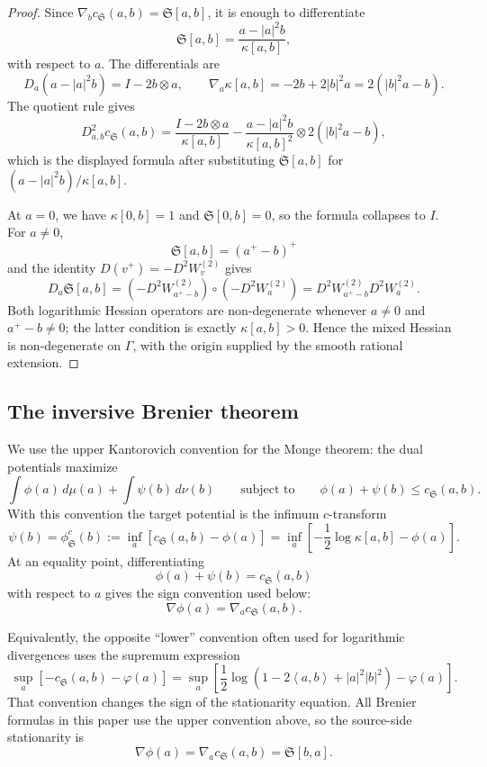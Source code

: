 \documentclass[11pt]{article}
\newcommand{\ip}[2]{\left\langle #1,#2\right\rangle}
\newcommand{\norm}[1]{\left|#1\right|}
\newcommand{\cs}{c_{\mathfrak S}}
\newcommand{\grad}{\nabla}
\newcommand{\Sbr}[2]{\mathfrak S[#1,#2]}
\newcommand{\kap}[2]{\kappa[#1,#2]}
\begin{document}
\begin{proof}
Since $\grad_b\cs(a,b)=\Sbr{a}{b}$, it is enough to differentiate
\[
    \Sbr{a}{b}=\frac{a-\norm a^2b}{\kap{a}{b}},
\]
with respect to $a$.  The differentials are
\[
    D_a(a-\norm a^2b)=I-2b\otimes a,
    \qquad
    \grad_a\kap{a}{b}=-2b+2\norm b^2a=2(\norm b^2a-b).
\]
The quotient rule gives
\[
    D^2_{a,b}\cs(a,b)
    =
    \frac{I-2b\otimes a}{\kap{a}{b}}
    -
    \frac{a-\norm a^2b}{\kap{a}{b}^2}
    \otimes 2(\norm b^2a-b),
\]
which is the displayed formula after substituting $\Sbr{a}{b}$ for $(a-\norm a^2b)/\kap{a}{b}$.

At $a=0$, we have $\kap{0}{b}=1$ and $\Sbr{0}{b}=0$, so the formula collapses to $I$.  For $a\neq0$,
\[
    \Sbr{a}{b}=(a^+-b)^+
\]
and the identity $D(v^+)=-D^2W^{(2)}_v$ gives
\[
    D_a\Sbr{a}{b}
    =
    \left(-D^2W^{(2)}_{a^+-b}\right)
    \circ
    \left(-D^2W^{(2)}_a\right)
    =
    D^2W^{(2)}_{a^+-b}D^2W^{(2)}_a.
\]
Both logarithmic Hessian operators are non-degenerate whenever $a\neq0$ and $a^+-b\neq0$; the latter condition is exactly $\kap{a}{b}>0$.  Hence the mixed Hessian is non-degenerate on $\Gamma$, with the origin supplied by the smooth rational extension.
\end{proof}

\subsection{The inversive Brenier theorem}

We use the upper Kantorovich convention for the Monge theorem: the dual potentials maximize
\[
    \int\phi(a)\,d\mu(a)+\int\psi(b)\,d\nu(b)
    \qquad\text{subject to}\qquad
    \phi(a)+\psi(b)\le \cs(a,b).
\]
With this convention the target potential is the infimum $c$-transform
\[
    \psi(b)=\phi^\cs(b)
    :=
    \inf_a\left[\cs(a,b)-\phi(a)\right]
    =
    \inf_a\left[-\frac12\log\kap{a}{b}-\phi(a)\right].
\]
At an equality point, differentiating
\[
    \phi(a)+\psi(b)=\cs(a,b)
\]
with respect to $a$ gives the sign convention used below:
\[
    \grad\phi(a)=\grad_a\cs(a,b).
\]

Equivalently, the opposite ``lower'' convention often used for logarithmic divergences uses the supremum expression
\[
    \sup_a\left[-\cs(a,b)-\varphi(a)\right]
    =
    \sup_a\left[
        \frac12\log\left(1-2\ip a b+\norm a^2\norm b^2\right)-\varphi(a)
    \right].
\]
That convention changes the sign of the stationarity equation.  All Brenier formulas in this paper use the upper convention above, so the source-side stationarity is
\[
    \grad\phi(a)=\grad_a\cs(a,b)=\Sbr{b}{a}.
\]
\end{document}
